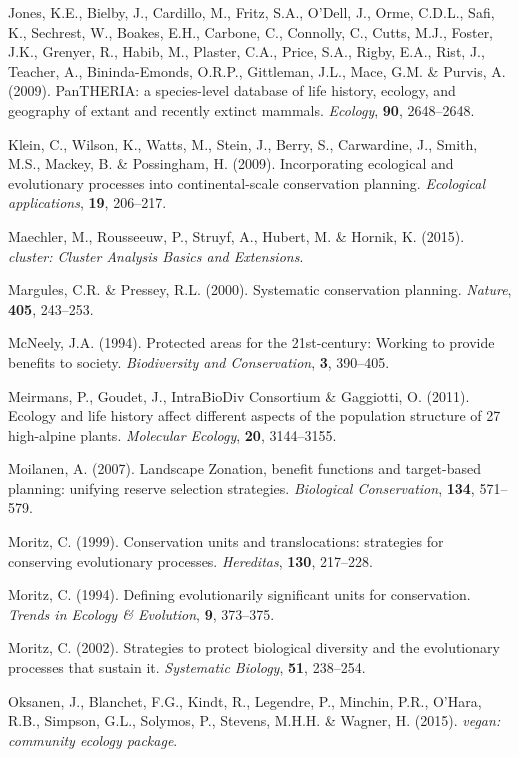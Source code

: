 \documentclass[11pt,]{article}
\begin{document}
Jones, K.E., Bielby, J., Cardillo, M., Fritz, S.A., O'Dell, J., Orme,
C.D.L., Safi, K., Sechrest, W., Boakes, E.H., Carbone, C., Connolly, C.,
Cutts, M.J., Foster, J.K., Grenyer, R., Habib, M., Plaster, C.A., Price,
S.A., Rigby, E.A., Rist, J., Teacher, A., Bininda-Emonds, O.R.P.,
Gittleman, J.L., Mace, G.M. \& Purvis, A. (2009). PanTHERIA: a
species-level database of life history, ecology, and geography of extant
and recently extinct mammals. \emph{Ecology}, \textbf{90}, 2648--2648.

Klein, C., Wilson, K., Watts, M., Stein, J., Berry, S., Carwardine, J.,
Smith, M.S., Mackey, B. \& Possingham, H. (2009). Incorporating
ecological and evolutionary processes into continental-scale
conservation planning. \emph{Ecological applications}, \textbf{19},
206--217.

Maechler, M., Rousseeuw, P., Struyf, A., Hubert, M. \& Hornik, K.
(2015). \emph{cluster: Cluster Analysis Basics and Extensions}.

Margules, C.R. \& Pressey, R.L. (2000). Systematic conservation
planning. \emph{Nature}, \textbf{405}, 243--253.

McNeely, J.A. (1994). Protected areas for the 21st-century: Working to
provide benefits to society. \emph{Biodiversity and Conservation},
\textbf{3}, 390--405.

Meirmans, P., Goudet, J., IntraBioDiv Consortium \& Gaggiotti, O.
(2011). Ecology and life history affect different aspects of the
population structure of 27 high-alpine plants. \emph{Molecular Ecology},
\textbf{20}, 3144--3155.

Moilanen, A. (2007). Landscape Zonation, benefit functions and
target-based planning: unifying reserve selection strategies.
\emph{Biological Conservation}, \textbf{134}, 571--579.

Moritz, C. (1999). Conservation units and translocations: strategies for
conserving evolutionary processes. \emph{Hereditas}, \textbf{130},
217--228.

Moritz, C. (1994). Defining evolutionarily significant units for
conservation. \emph{Trends in Ecology \& Evolution}, \textbf{9},
373--375.

Moritz, C. (2002). Strategies to protect biological diversity and the
evolutionary processes that sustain it. \emph{Systematic Biology},
\textbf{51}, 238--254.

Oksanen, J., Blanchet, F.G., Kindt, R., Legendre, P., Minchin, P.R.,
O'Hara, R.B., Simpson, G.L., Solymos, P., Stevens, M.H.H. \& Wagner, H.
(2015). \emph{vegan: community ecology package}.
\end{document}
